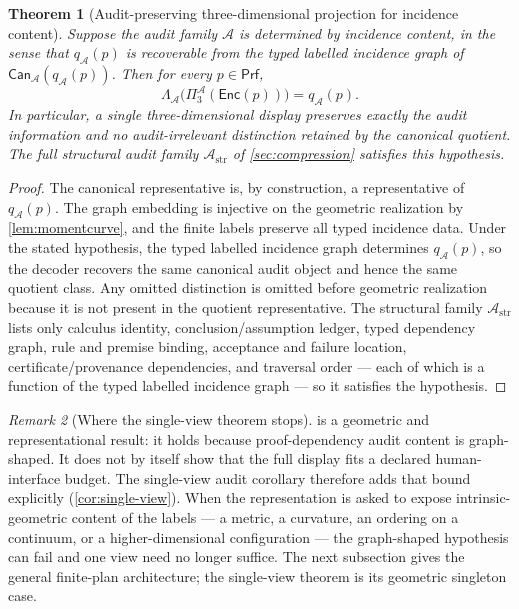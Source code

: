 \documentclass[11pt]{article}
\newcommand{\Prf}{\mathsf{Prf}}
\newcommand{\Enc}{\mathsf{Enc}}
\newcommand{\Can}{\mathsf{Can}}
\newcommand{\qA}{q_{\mathcal A}}
\newcommand{\mcA}{\mathcal A}
\theoremstyle{plain}
\newtheorem{theorem}{Theorem}[section]
\theoremstyle{definition}
\theoremstyle{remark}
\newtheorem{remark}[theorem]{Remark}
\begin{document}
\begin{theorem}[Audit-preserving three-dimensional projection for incidence content]
\label{thm:3d-preservation}
Suppose the audit family $\mcA$ is determined by incidence content, in the sense that $\qA(p)$ is recoverable from the typed labelled incidence graph of $\Can_\mcA(\qA(p))$.  Then for every $p\in\Prf$,
\[
  \Lambda_{\mcA}\bigl(\Pi^{\mcA}_3(\Enc(p))\bigr)=\qA(p).
\]
In particular, a single three-dimensional display preserves exactly the audit information and no audit-irrelevant distinction retained by the canonical quotient.  The full structural audit family $\mcA_{\mathrm{str}}$ of \cref{sec:compression} satisfies this hypothesis.
\end{theorem}

\begin{proof}
The canonical representative is, by construction, a representative of $\qA(p)$.  The graph embedding is injective on the geometric realization by \cref{lem:momentcurve}, and the finite labels preserve all typed incidence data.  Under the stated hypothesis, the typed labelled incidence graph determines $\qA(p)$, so the decoder recovers the same canonical audit object and hence the same quotient class.  Any omitted distinction is omitted before geometric realization because it is not present in the quotient representative.  The structural family $\mcA_{\mathrm{str}}$ lists only calculus identity, conclusion/assumption ledger, typed dependency graph, rule and premise binding, acceptance and failure location, certificate/provenance dependencies, and traversal order --- each of which is a function of the typed labelled incidence graph --- so it satisfies the hypothesis.
\end{proof}

\begin{remark}[Where the single-view theorem stops]
\label{rem:single-stops}
 is a geometric and representational result: it holds
because proof-dependency audit content is graph-shaped.  It does not by itself
show that the full display fits a declared human-interface budget.  The
single-view audit corollary therefore adds that bound explicitly
(\cref{cor:single-view}).  When the representation is asked to expose
intrinsic-geometric content of the labels --- a metric, a curvature, an ordering
on a continuum, or a higher-dimensional configuration --- the graph-shaped
hypothesis can fail and one view need no longer suffice.  The next subsection
gives the general finite-plan architecture; the single-view theorem is its
geometric singleton case.
\end{remark}
\end{document}
